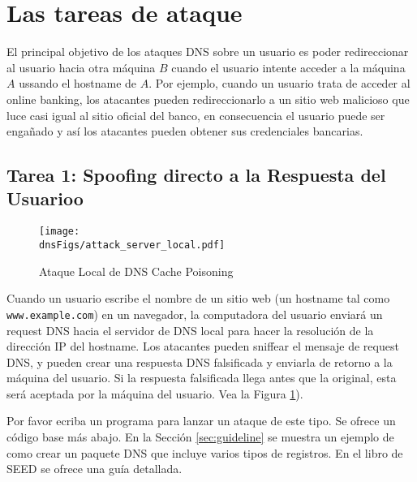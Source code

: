 \section{Las tareas de ataque}

El principal objetivo de los ataques DNS sobre un usuario es poder redireccionar al usuario hacia otra máquina $B$ cuando el usuario intente acceder a la máquina $A$ ussando el hostname de $A$. Por ejemplo, cuando un usuario trata de acceder al online banking, los atacantes pueden redireccionarlo a un sitio web malicioso que luce casi igual al sitio oficial del banco, en consecuencia el usuario puede ser engañado y así los atacantes pueden obtener sus credenciales bancarias.



\subsection{Tarea 1: Spoofing directo a la Respuesta del Usuarioo}



\begin{figure}[htb]
\centering
\texttt{[image: \\dnsFigs/attack\_server\_local.pdf]}
\caption{Ataque Local de DNS Cache Poisoning}
\label{dns:fig:local_attack}
\end{figure}

Cuando un usuario escribe el nombre de un sitio web (un hostname tal como {\tt
www.example.com}) en un navegador, la computadora del usuario enviará un request DNS hacia el servidor de DNS local para hacer la resolución de la dirección IP del hostname.
Los atacantes pueden sniffear el mensaje de request DNS, y pueden crear una respuesta DNS falsificada y enviarla de retorno a la máquina del usuario. Si la respuesta falsificada llega antes que la original, esta será aceptada por la máquina del usuario.
Vea la Figura \ref{dns:fig:local_attack}). 

Por favor ecriba un programa para lanzar un ataque de este tipo. Se ofrece un código base más abajo. En la Sección \ref{sec:guideline} se muestra un ejemplo de como crear un paquete DNS que incluye varios tipos de registros. En el libro de SEED se ofrece una guía detallada.


